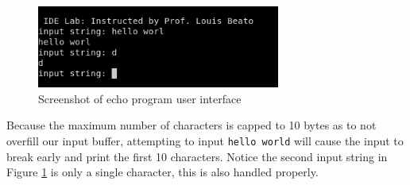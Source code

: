 \documentclass[CMPE]{../KGCOEReport}
\def\code#1{\texttt{#1}}
\begin{document}
    \begin{figure}[h!]
      \centering
      \includegraphics[width=8cm]{part3}
      \caption{Screenshot of echo program user interface}
      \label{fig:part3}
    \end{figure}

	Because the maximum number of characters is capped to 10 bytes as to not overfill our
	input buffer, attempting to input \code{hello world} will cause the input to break
	early and print the first 10 characters. Notice the second input string in Figure
	\ref{fig:part3} is only a single character, this is also handled properly. 


\end{document}
